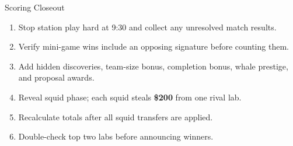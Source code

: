 \documentclass[12pt]{extarticle}
\begin{document}
\begin{minipage}[t]{0.485\textwidth}
\begin{labbox}{Scoring Closeout}
\begin{enumerate}
\item Stop station play hard at 9:30 and collect any unresolved match results.
\item Verify mini-game wins include an opposing signature before counting them.
\item Add hidden discoveries, team-size bonus, completion bonus, whale prestige, and proposal awards.
\item Reveal squid phase; each squid steals \textbf{\$200} from one rival lab.
\item Recalculate totals after all squid transfers are applied.
\item Double-check top two labs before announcing winners.
\end{enumerate}
\end{labbox}
\end{minipage}\hfill
\end{document}
